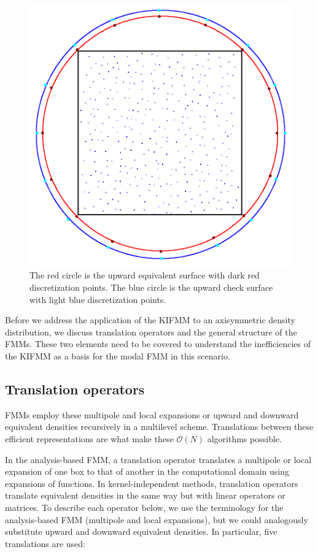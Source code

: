 \documentclass[11pt, oneside]{article}   	%
\begin{document}
\begin{figure}[h]
\caption{The red circle is the upward equivalent surface with dark red discretization points. The blue circle is the upward check surface with light blue discretization points.}
\label{fig:6}
\centering
\includegraphics[scale=0.25]{./images/eqdens1}
\end{figure}

Before we address the application of the KIFMM to an axisymmetric density distribution, we discuss translation operators and the general structure of the FMMs. These two elements need to be covered to understand the inefficiencies of the KIFMM as a basis for the modal FMM in this scenario.

\subsection{Translation operators}
FMMs employ these multipole and local expansions or upward and downward equivalent densities recursively in a multilevel scheme. Translations between these efficient representations are what make these $\mathcal{O}(N)$ algorithms possible.

In the analysis-based FMM, a translation operator translates a multipole or local expansion of one box to that of another in the computational domain using expansions of functions. In kernel-independent methods, translation operators translate equivalent densities in the same way but with linear operators or matrices. To describe each operator below, we use the terminology for the analysis-based FMM (multipole and local expansions), but we could analogously substitute upward and downward equivalent densities. In particular, five translations are used:
\end{document}
